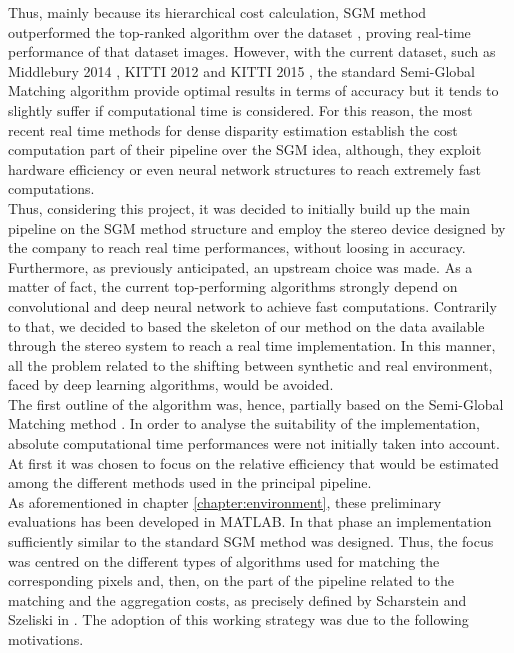 Thus, mainly because its hierarchical cost calculation, SGM method outperformed the top-ranked algorithm over the dataset \cite{scharstein2003high}, proving real-time performance of that dataset images. 
However, with the current dataset, such as Middlebury 2014 \cite{Scharstein2014}, KITTI 2012 \cite{geiger2013vision} and KITTI 2015 \cite{menze2015object}, the standard Semi-Global Matching algorithm provide optimal results in terms of accuracy but it tends to slightly suffer if computational time is considered.
For this reason, the most recent real time methods for dense disparity estimation establish the cost computation part of their pipeline over the SGM idea, although, they exploit hardware efficiency or even neural network structures to reach extremely fast computations.\\
Thus, considering this project, it was decided to initially build up the main pipeline on the SGM method structure and employ the stereo device designed by the company to reach real time performances, without loosing in accuracy. 
Furthermore, as previously anticipated, an upstream choice was made. 
As a matter of fact, the current top-performing algorithms strongly depend on convolutional and deep neural network to achieve fast computations.
Contrarily to that, we decided to based the skeleton of our method on the data available through the stereo system to reach a real time implementation.
In this manner, all the problem related to the shifting between synthetic and real environment, faced by deep learning algorithms, would be avoided. \\
The first outline of the algorithm was, hence, partially based on the Semi-Global Matching method \cite{Hirschmuller2008}. 
In order to analyse the suitability of the implementation, absolute computational time performances were not initially taken into account. 
At first it was chosen to focus on the relative efficiency that would be estimated among the different methods used in the principal pipeline.\\
As aforementioned in chapter \ref{chapter:environment}, these preliminary evaluations has been developed in MATLAB. 
In that phase an implementation sufficiently similar to the standard SGM method was designed. 
Thus, the focus was centred on the different types of algorithms used for matching the corresponding pixels and, then, on the part of the pipeline related to the matching and the aggregation costs, as precisely defined by Scharstein and Szeliski in \cite{Scharstein2001}.
The adoption of this working strategy was due to the following motivations. 
